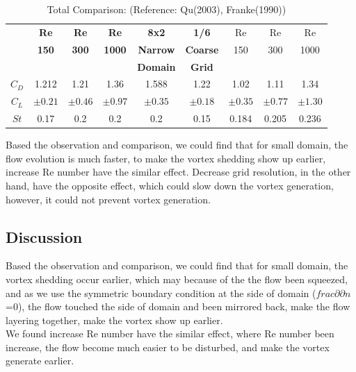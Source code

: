 \documentclass[12pt]{article}
\begin{document}
\begin{table}[H]
\centering
\label{tab:comparison}
\begin{tabular}{c|c|c|c|c|c|c|c |c}
\toprule
& \textbf{Re} & \textbf{Re} & \textbf{Re} & \textbf{8x2} & \textbf{1/6} & Re  & Re & Re \\ 
& \textbf{150} & \textbf{300} & \textbf{1000} & \textbf{Narrow} & \textbf{Coarse} & 150  & 300& 1000 \\ 
&  & &  & \textbf{Domain} & \textbf{Grid} & \cite{QU2013347} & \cite{FRANKE1990237}& \cite{QU2013347} \\ 
\hline
\textbf{\(C_D\)} & 1.212 & 1.21  &  1.36   & 1.588 & 1.22 & 1.02  & 1.11 & 1.34 \\ 
\textbf{\(C_L\)} & $\pm 0.21$ & $\pm 0.46$ & $\pm 0.97$  & $\pm 0.35$ & $\pm 0.18$ & $\pm 0.35$  & $\pm 0.77$ & $\pm 1.30$\\ 

\textbf{\(St\)} & 0.17 & 0.2 & 0.2  & 0.2 & 0.15 & 0.184  & 0.205 & 0.236 \\ 
\bottomrule
\end{tabular}
\caption{Total Comparison: (Reference: Qu(2003)\cite{QU2013347}, Franke(1990)\cite{FRANKE1990237})}
\end{table}


Based the observation and comparison, we could find that for small domain, the flow evolution is much faster, to make the vortex shedding show up earlier, increase Re number have the similar effect. Decrease grid resolution, in the other hand, have the opposite effect, which could slow down the vortex generation, however, it could not prevent vortex generation.









\subsection{Discussion}
Based the observation and comparison, we could find that for small domain, the vortex shedding occur earlier, which may because of the the flow been squeezed, and as we use the symmetric boundary condition at the side of domain ($frac{\partial}{\partial n}$=0), the flow touched the side of domain and been mirrored back, make the flow layering together, make the vortex show up earlier.\\

We found increase Re number have the similar effect, where Re number been increase, the flow become much easier to be disturbed, and make the vortex generate earlier.\\
\end{document}
